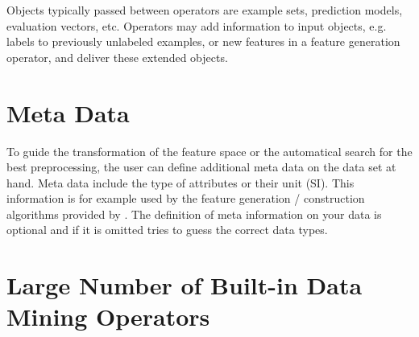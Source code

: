 Objects typically passed between operators are example sets, 
prediction models, evaluation vectors, etc.
Operators may add information to input objects, e.g. labels 
to previously unlabeled examples, or new features in a feature 
generation operator, and deliver these extended objects.




\section{Meta Data}

To guide the transformation of the feature space or the automatical search for
the best preprocessing, the user can define additional meta data on the data
set at hand. Meta data include the type of attributes or their unit (SI). This
information is for example used by the feature generation / construction
algorithms provided by \rapidminer. The definition of meta information on your data
is optional and if it is omitted \rapidminer tries to guess the correct data types.




\section{Large Number of Built-in Data Mining Operators}

